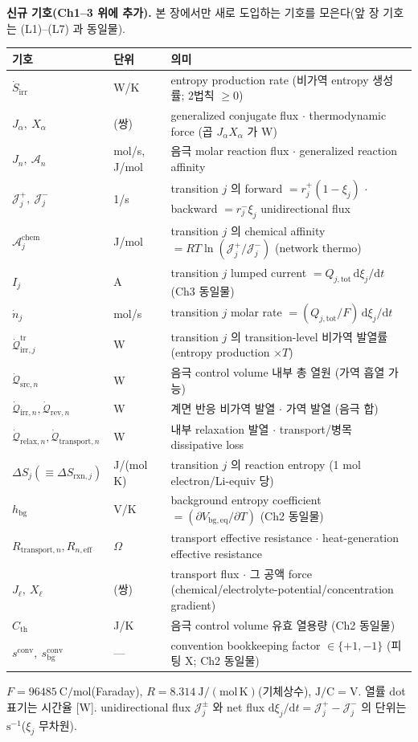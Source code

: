 \documentclass[11pt,a4paper]{article}
\newcommand{\dd}{\mathrm{d}}
\newcommand{\eff}{\mathrm{eff}}
\newcommand{\eq}{\mathrm{eq}}
\newcommand{\bg}{\mathrm{bg}}
\newcommand{\tot}{\mathrm{tot}}
\newcommand{\irr}{\mathrm{irr}}
\newcommand{\rev}{\mathrm{rev}}
\newcommand{\rxn}{\mathrm{rxn}}
\newcommand{\src}{\mathrm{src}}
\newcommand{\rlx}{\mathrm{relax}}
\newcommand{\conv}{\mathrm{conv}}
\newcommand{\transp}{\mathrm{transport}}
\newcommand{\tr}{\mathrm{tr}}
\newcommand{\chem}{\mathrm{chem}}
\begin{document}
\textbf{신규 기호(Ch1--3 위에 추가).} 본 장에서만 새로 도입하는 기호를 모은다(앞 장 기호는 (L1)--(L7) 과 동일물).
\begin{longtable}{p{} p{} >{\raggedright\arraybackslash}p{}}
\toprule 기호 & 단위 & 의미 \\ \midrule \endhead
$\dot S_\irr$ & W/K & entropy production rate (비가역 entropy 생성률; 2법칙 $\ge0$) \\
$J_\alpha,\ X_\alpha$ & (쌍) & generalized conjugate flux $\cdot$ thermodynamic force (곱 $J_\alpha X_\alpha$ 가 W) \\
$J_n,\ \mathcal A_n$ & mol/s, J/mol & 음극 molar reaction flux $\cdot$ generalized reaction affinity \\
$\mathcal J_j^+,\ \mathcal J_j^-$ & 1/s & transition $j$ 의 forward $=r_j^+(1-\xi_j)$ $\cdot$ backward $=r_j^-\xi_j$ unidirectional flux \\
$\mathcal A_j^{\chem}$ & J/mol & transition $j$ 의 chemical affinity $=RT\ln(\mathcal J_j^+/\mathcal J_j^-)$ (network thermo) \\
$I_j$ & A & transition $j$ lumped current $=Q_{j,\tot}\,\dd\xi_j/\dd t$ (Ch3 동일물) \\
$\dot n_j$ & mol/s & transition $j$ molar rate $=(Q_{j,\tot}/F)\,\dd\xi_j/\dd t$ \\
$\dot{\mathcal Q}_{\irr,j}^{\tr}$ & W & transition $j$ 의 transition-level 비가역 발열률 (entropy production $\times T$) \\
$\dot{\mathcal Q}_{\src,n}$ & W & 음극 control volume 내부 총 열원 (가역 흡열 가능) \\
$\dot{\mathcal Q}_{\irr,n},\dot{\mathcal Q}_{\rev,n}$ & W & 계면 반응 비가역 발열 $\cdot$ 가역 발열 (음극 합) \\
$\dot{\mathcal Q}_{\rlx,n},\dot{\mathcal Q}_{\transp,n}$ & W & 내부 relaxation 발열 $\cdot$ transport/병목 dissipative loss \\
$\Delta S_j(\equiv\Delta S_{\rxn,j})$ & J/(mol K) & transition $j$ 의 reaction entropy (1 mol electron/Li-equiv 당) \\
$h_\bg$ & V/K & background entropy coefficient $=(\partial V_{\bg,\eq}/\partial T)$ (Ch2 동일물) \\
$R_{\transp,n},R_{n,\eff}$ & $\Omega$ & transport effective resistance $\cdot$ heat-generation effective resistance \\
$J_\ell,\ X_\ell$ & (쌍) & transport flux $\cdot$ 그 공액 force (chemical/electrolyte-potential/concentration gradient) \\
$C_{\mathrm{th}}$ & J/K & 음극 control volume 유효 열용량 (Ch2 동일물) \\
$s^{\conv},\ s_\bg^\conv$ & --- & convention bookkeeping factor $\in\{+1,-1\}$ (피팅 X; Ch2 동일물) \\
\bottomrule
\end{longtable}
$F=96485\ \mathrm{C/mol}$(Faraday), $R=8.314\ \mathrm{J/(mol\,K)}$(기체상수), $\mathrm{J/C}=\mathrm V$. 열률 dot
표기는 시간율 [W]. unidirectional flux $\mathcal J_j^\pm$ 와 net flux $\dd\xi_j/\dd t=\mathcal J_j^+-\mathcal J_j^-$
의 단위는 $\mathrm{s^{-1}}$($\xi_j$ 무차원).
\end{document}
